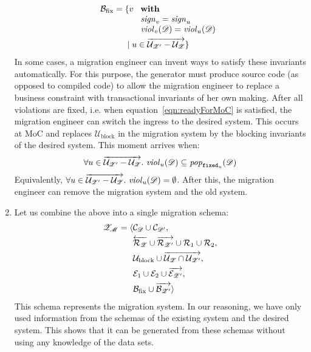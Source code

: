 \documentclass[runningheads]{llncs}
\newcommand{\id}[1]{\text{\it #1\/}}
\newcommand{\popF}[1]{\id{pop}_{#1}}
\newcommand{\pop}[2]{\popF{#1}(#2)}
\newcommand{\viol}[2]{\violC{#1}(#2)}
\newcommand{\violC}[1]{\id{viol}_{#1}}
\newcommand{\sign}[1]{\id{sign}_{#1}}
\newcommand{\concepts}{\mathcal{C}}
\newcommand{\rels}{\mathcal{R}}   %
\newcommand{\rules}{\mathcal{U}}
\newcommand{\transactions}{\mathcal{E}}
\newcommand{\busConstraints}{\mathcal{B}}
\newcommand{\dataset}{\mathscr{D}}
\newcommand{\schema}{\mathscr{Z}}
\newcommand{\migrsys}{\mathscr{M}}
\begin{document}
\begin{enumerate}
   \begin{align}
      \busConstraints_\text{fix}={}&\{v\ 
      \begin{array}[t]{l}
         \text{\bf with}\label{eqn:Bfix}\\
         \sign{v}=\sign{u}\\
         \viol{v}{\dataset}=\viol{u}{\dataset} %
      \end{array}\\
      &\mid u\in\overrightarrow{\rules_{\schema'}-\rules_{\schema}}\}\notag
   \end{align}
   In some cases, a migration engineer can invent ways to satisfy these invariants automatically.
   For this purpose, the generator must produce source code (as opposed to compiled code) to allow the migration engineer
   to replace a business constraint with transactional invariants of her own making.
   After all violations are fixed, i.e. when equation~\ref{eqn:readyForMoC} is satisfied,
   the migration engineer can switch the ingress to the desired system.
   This occurs at MoC and
   replaces $\rules_\text{block}$ in the migration system by the blocking invariants of the desired system.
   This moment arrives when:
   \begin{align}
      \forall u\in\overrightarrow{\rules_{\schema'}-\rules_{\schema}}.~{\viol{u}{\dataset}}\subseteq \pop{{\tt fixed}_u}{\dataset}
   \label{eqn:readyForMoC}
   \end{align}
   Equivalently, $\forall u\in\overrightarrow{\rules_{\schema'}-\rules_{\schema}}.~\viol{u}{\dataset} = \emptyset$. After this, the migration engineer can remove the migration system and the old system.

\item Let us combine the above into a single migration schema:
   \begin{align}
      \schema_\migrsys=\langle{}&\concepts_\dataset\cup\concepts_{\dataset'},\label{eqn:schema migrsys}\\
      &\overleftarrow{\rels_{\schema}}\cup\overrightarrow{\rels_{\schema'}}\cup\rels_1\cup\rels_2,\notag\\
      &\rules_\text{block}\cup\overrightarrow{\rules_{\schema}\cap\rules_{\schema'}},\notag\\
      &\transactions_1\cup\transactions_2\cup\overrightarrow{\transactions_{\schema'}},\notag\\
      &\busConstraints_\text{fix}\cup\overrightarrow{\busConstraints_{\schema'}}\rangle\notag
   \end{align}
   This schema represents the migration system.
   In our reasoning, we have only used information from the schemas of the existing system and the desired system.
   This shows that it can be generated from these schemas without using any knowledge of the data sets.
\end{enumerate}
\end{document}
